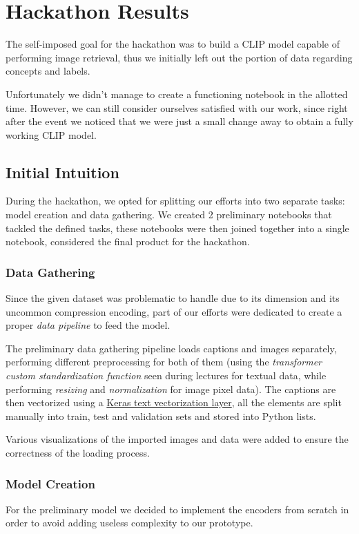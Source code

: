 \documentclass[10pt,twocolumn,letterpaper]{article}
\begin{document}
\section{Hackathon Results}
The self-imposed goal for the hackathon was to build a CLIP model capable of performing image retrieval, thus we initially left out the portion of data regarding concepts and labels.

Unfortunately we didn't manage to create a functioning notebook in the allotted time.
However, we can still consider ourselves satisfied with our work, since right after the event we noticed that we were just a small change away to obtain a fully working CLIP model.

\subsection{Initial Intuition}
During the hackathon, we opted for splitting our efforts into two separate tasks: model creation and data gathering.
We created 2 preliminary notebooks that tackled the defined tasks, these notebooks were then joined together into a single notebook, considered the final product for the hackathon.

\subsubsection{Data Gathering}
Since the given dataset was problematic to handle due to its dimension and its uncommon compression encoding, part of our efforts were dedicated to create a proper \textit{data pipeline} to feed the model.

The preliminary data gathering pipeline loads captions and images separately, performing different preprocessing for both of them (using the \textit{transformer custom standardization function} seen during lectures for textual data, while performing \textit{resizing} and \textit{normalization} for image pixel data).
The captions are then vectorized using a \href{https://www.tensorflow.org/api_docs/python/tf/keras/layers/TextVectorization}{Keras text vectorization layer}, all the elements are split manually into train, test and validation sets and stored into Python lists.

Various visualizations of the imported images and data were added to ensure the correctness of the loading process.

\subsubsection{Model Creation}
For the preliminary model we decided to implement the encoders from scratch in order to avoid adding useless complexity to our prototype.
\end{document}
